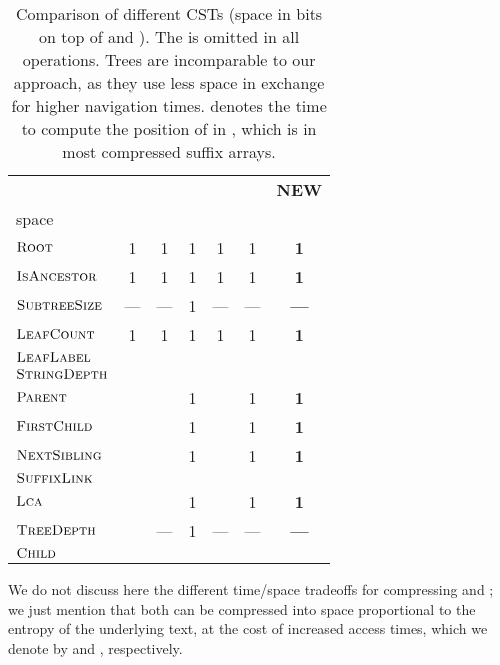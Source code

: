 \documentclass[11pt,onecolumn,final]{article} \usepackage{a4}
\newcommand{\lca}{\ensuremath{\textsc{Lca}}}
\newcommand{\sroot}{\ensuremath{\textsc{Root}}}
\newcommand{\ssize}{\ensuremath{\textsc{SubtreeSize}}}
\newcommand{\locate}{\ensuremath{\textsc{LeafLabel}}}
\newcommand{\parent}{\ensuremath{\textsc{Parent}}}
\newcommand{\ancestor}{\ensuremath{\textsc{IsAncestor}}}
\newcommand{\sdepth}{\ensuremath{\textsc{StringDepth}}}
\newcommand{\tdepth}{\ensuremath{\textsc{TreeDepth}}}
\newcommand{\scount}{\ensuremath{\textsc{LeafCount}}}
\newcommand{\fchild}{\ensuremath{\textsc{FirstChild}}}
\newcommand{\nsibling}{\ensuremath{\textsc{NextSibling}}}
\newcommand{\child}{\ensuremath{\textsc{Child}}}
\newcommand{\slink}{\ensuremath{\textsc{SuffixLink}}}
\theoremstyle{plain}
\theoremstyle{remark}
\begin{document}
\begin{table}[t]
  \small
  \centering
  \caption{Comparison of different CSTs (space in bits on top of  and ). The  is omitted in all operations. Trees \cite{russo08fully,fischer09faster,ohlebusch09compressed} are incomparable to our approach, as they use less space in exchange for higher navigation times.  denotes the time to compute the position of  in , which is  in most compressed suffix arrays.}
  \label{tbl:cst}
  \begin{tabular}{|l||c|c||c|c|c|c|}
    \hline
    & \textbf{\cite{russo08fully}} & \textbf{\cite{fischer09faster,canovas10practical}}& \textbf{\cite{munro01space,grossi05compressed,sadakane07compressed}} & \textbf{\cite{ohlebusch09compressed}} & \textbf{\cite{ohlebusch10cst++}} & \textbf{NEW}\\
    \hfill space &  &  &  &  &  & \boldmath \\ \hline\hline
    \sroot & 1 & 1 & 1 & 1 & 1 & \textbf{1}\\\hline
    \ancestor & 1 & 1 & 1 & 1 & 1 & \textbf{1}\\\hline
    \ssize & --- & --- & 1 & --- & --- & \textbf{---}\\\hline
    \scount & 1 & 1 & 1 & 1 & 1 & \textbf{1}\\\hline
    \locate &  &  &  &  &  & \boldmath\\\hline
    \sdepth &  &  &  &  &  & \boldmath \\\hline
    \parent &  &  & 1 &  & 1 & \textbf{1} \\\hline
    \fchild &  &  & 1 &  & 1 & \textbf{1} \\\hline
    \nsibling&  &  & 1 &  & 1 & \textbf{1} \\\hline
    \slink&  &  &  &  &  & \boldmath\\\hline
    \lca &  &  & 1 &  & 1 & \textbf{1}\\\hline
    \tdepth &  & --- & 1 & --- & --- & \textbf{---} \\\hline
    \child &  & \scriptsize  &  &  &  & \boldmath\\\hline
  \end{tabular}
\end{table}

We do not discuss here the different time/space tradeoffs for compressing  and ; we just mention that both can be compressed into space proportional to the entropy of the underlying text, at the cost of increased access times, which we denote by  and , respectively.
\end{document}

